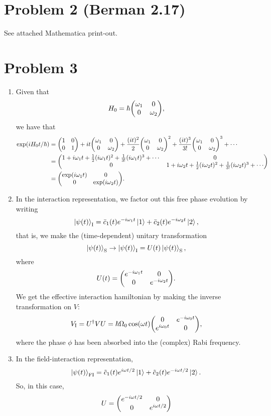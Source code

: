 \documentclass[12pt]{article}
\begin{document}
\section*{Problem 2 {\small (Berman 2.17)}}
See attached Mathematica print-out.

\section*{Problem 3}
\begin{enumerate}[label=(\alph*)]
    \item Given that
    \[ H_0 = \hbar\mqty(\omega_1&0\\0&\omega_2), \]
    we have that
    \begin{align*}
        \exp(iH_0t/\hbar) &= \mqty(1&0\\0&1) + it\mqty(\omega_1&0\\0&\omega_2) + \frac{(it)^2}{2}\mqty(\omega_1&0\\0&\omega_2)^2 + \frac{(it)^3}{3!}\mqty(\omega_1&0\\0&\omega_2)^3 + \cdots \\
        &= \mqty(1 + i\omega_1t + \frac{1}{2}(i\omega_1t)^2 + \frac{1}{3!}(i\omega_1 t)^3 + \cdots & 0 \\ 0 & 1 + i\omega_2t + \frac{1}{2}(i\omega_2t)^2 + \frac{1}{3!}(i\omega_2t)^3 + \cdots) \\
        &= \mqty(\exp(i\omega_1t)&0\\0&\exp(i\omega_2t)).
    \end{align*}

    \item In the interaction representation, we factor out this free phase evolution by writing
    \[ \ket{\psi(t)}_\text{I} = \bar{c}_1(t)e^{-i\omega_1t}\ket{1} + \bar{c}_2(t)e^{-i\omega_2t}\ket{2}, \]
    that is, we make the (time-dependent) unitary transformation
    \[ \ket{\psi(t)}_\text{S} \to \ket{\psi(t)}_\text{I} = U(t)\ket{\psi(t)}_\text{S}, \]
    where
    \[ U(t) = \mqty(e^{-i\omega_1t}&0\\0&e^{-i\omega_2t}). \] 
    We get the effective interaction hamiltonian by making the inverse transformation on $V$:
    \[ V_\text{I} = U^\dag VU = \hbar\Omega_0 \cos(\omega t) \mqty(0&e^{-i\omega_0t}\\e^{i\omega_0t}&0), \]
    where the phase $\phi$ has been absorbed into the (complex) Rabi frequency.

    \item In the field-interaction representation, 
    \[ \ket{\psi(t)}_\text{FI} = \tilde{c}_1(t)e^{i\omega t/2}\ket{1} + \tilde{c}_2(t)e^{-i\omega t/2}\ket{2}. \]
    So, in this case,
    \[ U = \mqty(e^{-i\omega t/2}&0\\0&e^{i\omega t/2}) \]
\end{enumerate}
\end{document}
